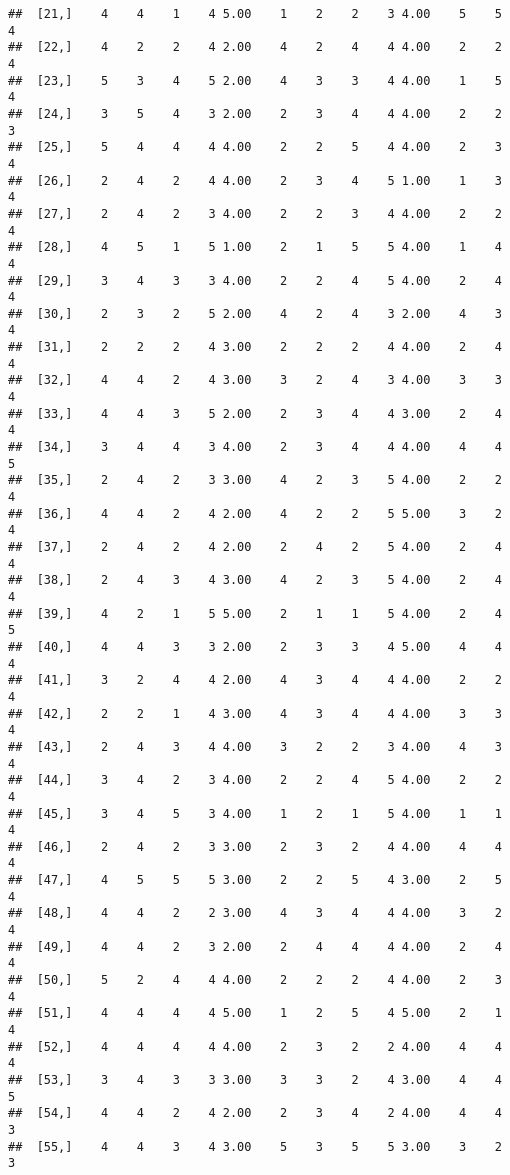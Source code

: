 \documentclass[]{article}
\begin{document}
\begin{verbatim}
##  [21,]    4    4    1    4 5.00    1    2    2    3 4.00    5    5    4
##  [22,]    4    2    2    4 2.00    4    2    4    4 4.00    2    2    4
##  [23,]    5    3    4    5 2.00    4    3    3    4 4.00    1    5    4
##  [24,]    3    5    4    3 2.00    2    3    4    4 4.00    2    2    3
##  [25,]    5    4    4    4 4.00    2    2    5    4 4.00    2    3    4
##  [26,]    2    4    2    4 4.00    2    3    4    5 1.00    1    3    4
##  [27,]    2    4    2    3 4.00    2    2    3    4 4.00    2    2    4
##  [28,]    4    5    1    5 1.00    2    1    5    5 4.00    1    4    4
##  [29,]    3    4    3    3 4.00    2    2    4    5 4.00    2    4    4
##  [30,]    2    3    2    5 2.00    4    2    4    3 2.00    4    3    4
##  [31,]    2    2    2    4 3.00    2    2    2    4 4.00    2    4    4
##  [32,]    4    4    2    4 3.00    3    2    4    3 4.00    3    3    4
##  [33,]    4    4    3    5 2.00    2    3    4    4 3.00    2    4    4
##  [34,]    3    4    4    3 4.00    2    3    4    4 4.00    4    4    5
##  [35,]    2    4    2    3 3.00    4    2    3    5 4.00    2    2    4
##  [36,]    4    4    2    4 2.00    4    2    2    5 5.00    3    2    4
##  [37,]    2    4    2    4 2.00    2    4    2    5 4.00    2    4    4
##  [38,]    2    4    3    4 3.00    4    2    3    5 4.00    2    4    4
##  [39,]    4    2    1    5 5.00    2    1    1    5 4.00    2    4    5
##  [40,]    4    4    3    3 2.00    2    3    3    4 5.00    4    4    4
##  [41,]    3    2    4    4 2.00    4    3    4    4 4.00    2    2    4
##  [42,]    2    2    1    4 3.00    4    3    4    4 4.00    3    3    4
##  [43,]    2    4    3    4 4.00    3    2    2    3 4.00    4    3    4
##  [44,]    3    4    2    3 4.00    2    2    4    5 4.00    2    2    4
##  [45,]    3    4    5    3 4.00    1    2    1    5 4.00    1    1    4
##  [46,]    2    4    2    3 3.00    2    3    2    4 4.00    4    4    4
##  [47,]    4    5    5    5 3.00    2    2    5    4 3.00    2    5    4
##  [48,]    4    4    2    2 3.00    4    3    4    4 4.00    3    2    4
##  [49,]    4    4    2    3 2.00    2    4    4    4 4.00    2    4    4
##  [50,]    5    2    4    4 4.00    2    2    2    4 4.00    2    3    4
##  [51,]    4    4    4    4 5.00    1    2    5    4 5.00    2    1    4
##  [52,]    4    4    4    4 4.00    2    3    2    2 4.00    4    4    4
##  [53,]    3    4    3    3 3.00    3    3    2    4 3.00    4    4    5
##  [54,]    4    4    2    4 2.00    2    3    4    2 4.00    4    4    3
##  [55,]    4    4    3    4 3.00    5    3    5    5 3.00    3    2    3

\end{verbatim}
\end{document}
